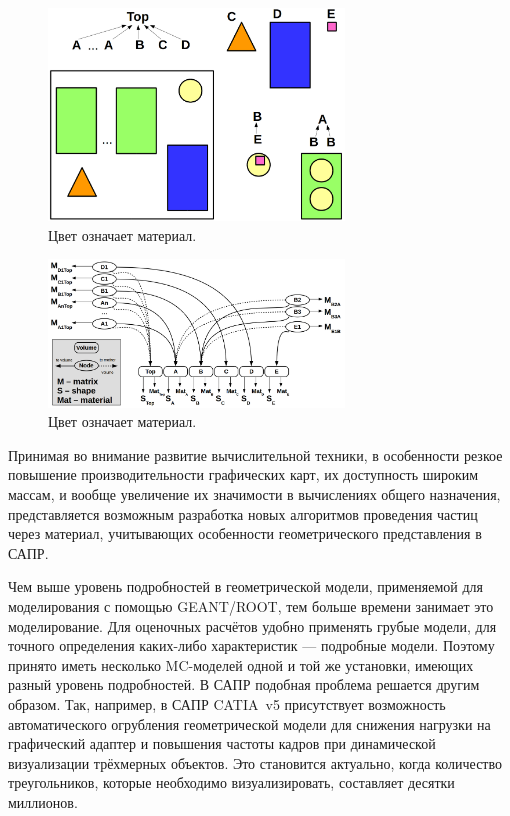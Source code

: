 \begin{figure}[H]
\centering
\includegraphics[width=0.7\textwidth]{pictures/ROOT_geo2.png}
\caption{Цвет означает материал.} %
\label{fig:ROOTgeo2}
\end{figure}

\begin{figure}[H]
\centering
\includegraphics[width=0.7\textwidth]{pictures/ROOT_geo3.png}
\caption{Цвет означает материал.} %
\label{fig:ROOTgeo3}
\end{figure}

Принимая во внимание развитие вычислительной техники, в особенности резкое повышение производительности графических карт, их доступность широким массам, и вообще увеличение их значимости в вычислениях общего назначения, представляется возможным разработка новых алгоритмов проведения частиц через материал, учитывающих особенности геометрического представления в САПР.

Чем выше уровень подробностей в геометрической модели, применяемой для моделирования с помощью GEANT/ROOT, тем больше времени занимает это моделирование. Для оценочных расчётов удобно применять грубые модели, для точного определения каких-либо характеристик --- подробные модели. Поэтому принято иметь несколько MC-моделей одной и той же установки, имеющих разный уровень подробностей.
В САПР подобная проблема решается другим образом. Так, например, в САПР CATIA~v5 присутствует возможность автоматического огрубления геометрической модели для снижения нагрузки на графический адаптер и повышения частоты кадров при динамической визуализации трёхмерных объектов. Это становится актуально, когда количество треугольников, которые необходимо визуализировать, составляет десятки миллионов.

